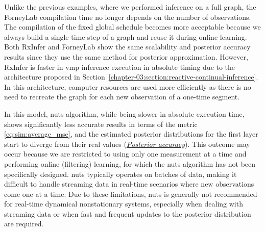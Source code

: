 Unlike the previous examples, where we performed inference on a full graph, the ForneyLab
compilation time no longer depends on the number of observations.
The compilation of the fixed global schedule becomes more acceptable because we always build a single time step of a graph and reuse it during online learning.
Both RxInfer and ForneyLab show the same scalability and posterior accuracy results since they
use the same method for posterior approximation.
However, RxInfer is faster in \ac{vmp} inference execution in absolute timing due to the
architecture proposed in Section~\ref{chapter-03:section:reactive-continual-inference}.
In this architecture, computer resources are used more efficiently as there is no need to
recreate the graph for each new observation of a one-time segment.

In this model, \ac{nuts} algorithm, while being slower in absolute execution time, shows
significantly less accurate results in terms of the metric \eqref{eq:sim:average_mse}, and the
estimated posterior distributions for the first layer start to diverge from their real values  (\hyperlink{experiments:accuracy}{\emph{Posterior accuracy}}).
This outcome may occur because we are restricted to using only one measurement at a time and
performing online (filtering) learning, for which the \ac{nuts} algorithm has not been specifically
designed.
\ac{nuts} typically operates on batches of data, making it difficult to handle streaming data in
real-time scenarios where new observations come one at a time.
Due to these limitations, \ac{nuts} is generally not recommended for real-time dynamical nonstationary
systems, especially when dealing with streaming data or when fast and frequent updates to the
posterior distribution are required.


